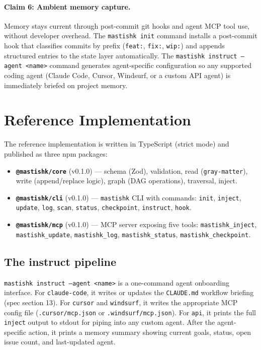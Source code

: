 \documentclass[11pt]{article}
\begin{document}
\paragraph{Claim 6: Ambient memory capture.}
Memory stays current through post-commit git hooks and agent MCP tool use, without developer overhead. The \texttt{mastishk init} command installs a post-commit hook that classifies commits by prefix (\texttt{feat:}, \texttt{fix:}, \texttt{wip:}) and appends structured entries to the state layer automatically. The \texttt{mastishk instruct --agent <name>} command generates agent-specific configuration so any supported coding agent (Claude Code, Cursor, Windsurf, or a custom API agent) is immediately briefed on project memory.

\section{Reference Implementation}
\label{sec:implementation}

The reference implementation is written in TypeScript (strict mode) and published as three npm packages:

\begin{itemize}
  \item \textbf{\texttt{@mastishk/core}} (v0.1.0) --- schema (Zod), validation, read (\texttt{gray-matter}), write (append/replace logic), graph (DAG operations), traversal, inject.
  \item \textbf{\texttt{@mastishk/cli}} (v0.1.0) --- \texttt{mastishk} CLI with commands: \texttt{init}, \texttt{inject}, \texttt{update}, \texttt{log}, \texttt{scan}, \texttt{status}, \texttt{checkpoint}, \texttt{instruct}, \texttt{hook}.
  \item \textbf{\texttt{@mastishk/mcp}} (v0.1.0) --- MCP server exposing five tools: \texttt{mastishk\_inject}, \texttt{mastishk\_update}, \texttt{mastishk\_log}, \texttt{mastishk\_status}, \texttt{mastishk\_checkpoint}.
\end{itemize}

\subsection{The instruct pipeline}

\texttt{mastishk instruct --agent <name>} is a one-command agent onboarding interface. For \texttt{claude-code}, it writes or updates the \texttt{CLAUDE.md} workflow briefing (spec section 13). For \texttt{cursor} and \texttt{windsurf}, it writes the appropriate MCP config file (\texttt{.cursor/mcp.json} or \texttt{.windsurf/mcp.json}). For \texttt{api}, it prints the full \texttt{inject} output to stdout for piping into any custom agent. After the agent-specific action, it prints a memory summary showing current goals, status, open issue count, and last-updated agent.
\end{document}
